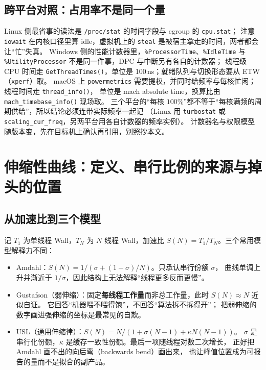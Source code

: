 \documentclass[12pt,a4paper,fontset=fandol]{ctexbook}
\newcommand{\Fn}[1]{\texttt{#1()}}
\newcommand{\Tp}[1]{\texttt{#1}}
\newcommand{\Bk}{\discretionary{}{}{}}
\newcommand{\Lang}[1]{\textsf{#1}}
\newcommand{\MWall}{\Lang{Wall}}
\begin{document}
\subsection{跨平台对照：占用率不是同一个量}

Linux 侧最省事的读法是 \Tp{/proc/stat} 的时间字段与 cgroup 的 \Tp{cpu.stat}；
注意 \Tp{iowait} 在内核口径里算 idle，虚拟机上的 \Tp{steal} 是被宿主拿走的时间，两者都会让``忙''失真。
Windows 侧的性能计数器里，\Tp{\%{\Bk}Processor{\Bk}Time}、\Tp{\%{\Bk}Idle{\Bk}Time} 与
\Tp{\%{\Bk}Utility{\Bk}Processor} 不是同一件事，DPC 与中断另有各自的计数器；
线程级 CPU 时间走 \Fn{GetThreadTimes}，单位是 100\,ns；就绪队列与切换形态要从 ETW（\Tp{xperf}）取。
macOS 上 \Tp{powermetrics} 需要提权，并同时给频率与每核忙闲；线程时间走 \Fn{thread\_info}，
单位是 mach absolute time，换算比由 \Fn{mach\_timebase\_info} 现场取。
三个平台的``每核 $100\%$''都不等于``每核满频的周期供给''，所以结论必须连带实际频率一起记
（Linux 用 \Tp{turbostat} 或 \Tp{scaling{\Bk}\_cur{\Bk}\_freq}，另两平台用各自计数器的频率实例）。
计数器名与权限模型随版本变，先在目标机上确认再引用，别照抄本文。

\section{伸缩性曲线：定义、串行比例的来源与掉头的位置}
\label{sec:pm09-scaling}

\subsection{从加速比到三个模型}

记 $T_1$ 为单线程 \MWall，$T_N$ 为 $N$ 线程 \MWall，加速比 $S(N) = T_1 / T_N$。三个常用模型解释力不同：

\begin{itemize}
\item Amdahl：$S(N) = 1 / (\sigma + (1 - \sigma) / N)$。只承认串行份额 $\sigma$，
      曲线单调上升并渐近于 $1/\sigma$，因此结构上无法解释``线程更多反而更慢''。
\item Gustafson（弱伸缩）：固定\textbf{每线程工作量}而非总工作量，此时 $S(N) \approx N$ 近似自证。
      它回答``机器喂不喂得饱''，不回答``算法拆不拆得开''；
      把弱伸缩的数字画进强伸缩的坐标是最常见的自欺。
\item USL（通用伸缩律）：$S(N) = N / (1 + \sigma (N - 1) + \kappa N (N - 1))$。
      $\sigma$ 是串行化份额，$\kappa$ 是缓存一致性份额。最后一项随线程对数二次增长，
      正好把 Amdahl 画不出的向后弯（backwards bend）画出来，
      也让峰值位置成为可报告的量而不是拟合的副产品。
\end{itemize}
\end{document}
